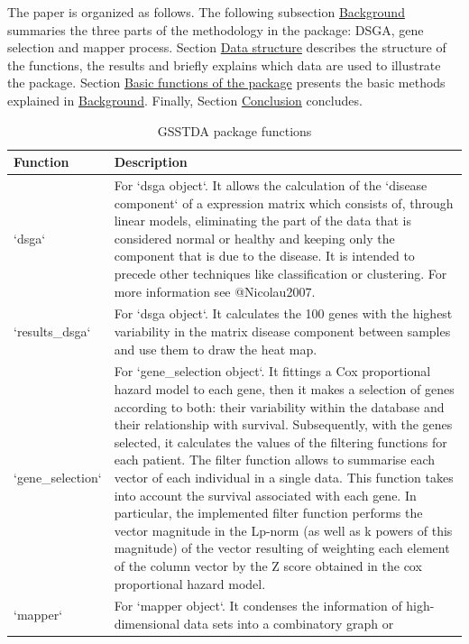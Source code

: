 The paper is organized as follows. The following subsection \protect\hyperlink{section2}{Background} summaries the three parts of the methodology in the  package: DSGA, gene selection and mapper process. Section \protect\hyperlink{section3}{Data structure} describes the structure of the functions, the results and briefly explains which data are used to illustrate the package. Section \protect\hyperlink{section4}{Basic functions of the package} presents the basic methods explained in \protect\hyperlink{section2}{Background}. Finally, Section \protect\hyperlink{section5}{Conclusion} concludes.

\begin{table}

\caption{\label{tab:fun-tabl}GSSTDA package functions}
\centering
\begin{tabular}[t]{>{\raggedright\arraybackslash}p{1in}>{\raggedright\arraybackslash}p{4in}}
\toprule
Function & Description\\
\midrule
`dsga` & For `dsga object`. It allows the calculation of the `disease component` of 
 a expression matrix which consists of, through linear models, eliminating the part of the data that is considered normal or healthy and keeping only the 
 component that is due to the  disease. It is intended to precede other techniques like  classification or clustering. 
 For more information see @Nicolau2007.\\
`results\_dsga` & For `dsga object`. It calculates the 100 genes with the highest variability in 
 the matrix disease component between samples and use them to draw the heat map.\\
`gene\_selection` & For `gene\_selection object`. It fittings a Cox proportional hazard model to 
 each gene, then it makes a selection of genes according to both: their variability within the database and their relationship with survival. Subsequently, with the genes selected, it calculates the values of the filtering functions for each patient. 
 The filter function allows to summarise each vector of each individual in a single data. This function takes into account the 
 survival associated with each gene. In particular, the implemented filter function performs the vector magnitude 
 in the Lp-norm (as well as k powers of this magnitude) of the vector resulting of weighting each element of 
 the column vector by the Z score obtained in the cox proportional hazard model.\\
`mapper` & For `mapper object`. It condenses the information of high-dimensional data sets into a combinatory graph or 

\end{tabular}
\end{table}
